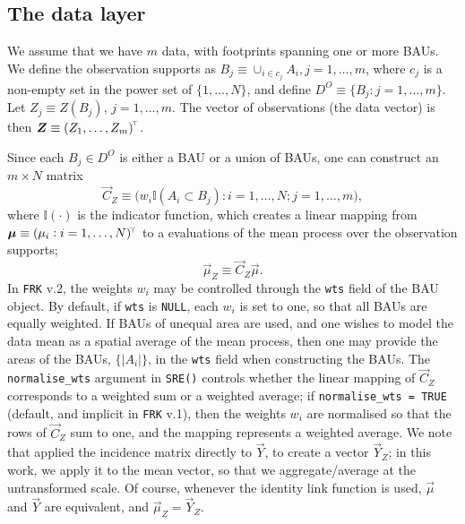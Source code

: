\documentclass[12pt,a4paper]{article}
\begin{document}
\subsection{The data layer}\label{subsection:04-02:DataLayer}




We assume that we have $m$ data, with footprints spanning one or more BAUs. 
We define the observation supports as $B_j \equiv \cup_{i\in c_j} A_i, j = 1, \dots, m$, where $c_j$ is a non-empty set in the power set of $\{1, \dots, N\}$, and define $D^O \equiv \{B_j : j = 1, \dots, m\}$. 
Let $Z_j \equiv Z(B_j)$, $j = 1, \dots, m$. 
The vector of observations (the data vector) is then $\vec{Z} \equiv \left(Z_1, \dots, Z_m\right)^\tp$.


Since each $B_j \in D^O$ is either a BAU or a union of BAUs, one can construct an $m\times N$ matrix 
\[
\vec{C}_Z \equiv \Big(w_i\mathbb{I}(A_i \subset B_j) : i = 1, \dots, N; j = 1, \dots, m\Big),
\]
where $\mathbb{I}(\cdot)$ is the indicator function, which creates a linear mapping from $\vec{\mu} \equiv (\mu_i: i = 1, \dots, N)^\tp$ to a evaluations of the mean process over the observation supports;
\begin{equation}\label{eqn:04-01:mu_Z}
\vec{\mu}_Z \equiv \vec{C}_Z\vec{\mu}.  
\end{equation}
In \texttt{FRK} v.2, the weights $w_i$ may be controlled through the \texttt{wts} field of the BAU object. 
By default, if \texttt{wts} is \texttt{NULL}, each $w_i$ is set to one, so that all BAUs are equally weighted. 
If BAUs of unequal area are used, and one wishes to model the data mean as a spatial average of the mean process, then one may provide the areas of the BAUs, $\{|A_i|\}$, in the \texttt{wts} field when constructing the BAUs. 
The \mbox{\texttt{normalise\_wts}} argument in \texttt{SRE()} controls whether the linear mapping of $\vec{C}_Z$ corresponds to a weighted sum or a weighted average; if \mbox{\texttt{normalise\_wts = TRUE}} (default, and implicit in \texttt{FRK} v.1), then the weights $w_i$ are normalised so that the rows of $\vec{C}_Z$ sum to one, and the mapping represents a weighted average.
We note that \cite{FRK_paper} applied the incidence matrix directly to $\vec{Y}$, to create a vector $\vec{Y}_Z$; in this work, we apply it to the mean vector, so that we aggregate/average at the untransformed scale.
Of course,  whenever the identity link function is used, 
$\vec{\mu}$ and $\vec{Y}$ are  equivalent, and  $\vec{\mu}_Z = \vec{Y}_Z$.
\end{document}
